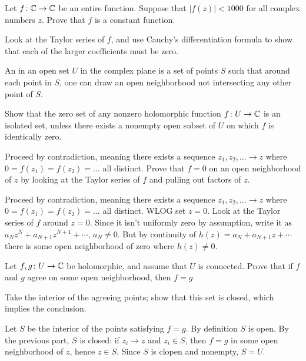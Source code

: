 \begin{sproblem}
	\gim
	Let $f \colon \mathbb C \to \mathbb C$ be an entire function.
	Suppose that $\left\lvert f(z) \right\rvert < 1000$ for all complex numbers $z$.
	Prove that $f$ is a constant function.
	\begin{hint}
		Look at the Taylor series of $f$,
		and use Cauchy's differentiation formula to
		show that each of the larger coefficients must be zero.
	\end{hint}
\end{sproblem}

\begin{sproblem}
	An  in an open set $U$ in the complex plane is a
	set of points $S$ such that around each point in $S$,
	one can draw an open neighborhood not intersecting any other point of $S$.

	Show that the zero set of any nonzero holomorphic
	function $f \colon U \to \mathbb C$ is an isolated set,
	unless there exists a nonempty open subset of $U$
	on which $f$ is identically zero.
	\begin{hint}
		Proceed by contradiction,
		meaning there exists a sequence $z_1, z_2, \dotsc \to z$
		where $0 = f(z_1) = f(z_2) = \dots$ all distinct.
		Prove that $f = 0$ on an open neighborhood of $z$
		by looking at the Taylor series of $f$ and
		pulling out factors of $z$.
	\end{hint}
	\begin{sol}
		Proceed by contradiction, meaning there exists a sequence $z_1, z_2, \dotsc \to z$
		where $0 = f(z_1) = f(z_2) = \dots$ all distinct.
		WLOG set $z=0$.
		Look at the Taylor series of $f$ around $z=0$.
		Since it isn't uniformly zero by assumption,
		write it as $a_N z^N + a_{N+1}z^{N+1} + \cdots$, $a_N \neq 0$.
		But by continuity of $h(z) = a_N + a_{N+1}z + \cdots$ there is some
		open neighborhood of zero where $h(z) \neq 0$.
	\end{sol}
\end{sproblem}

\begin{sproblem}
	\label{prob:identity_thm}
	\gim
	Let $f, g \colon U \to \mathbb C$ be holomorphic, and assume that $U$ is connected.
	Prove that if $f$ and $g$ agree on some open neighborhood,
	then $f = g$.
	\begin{hint}
		Take the interior of the agreeing points;
		show that this set is closed, which implies the conclusion.
	\end{hint}
	\begin{sol}
		Let $S$ be the interior of the points satisfying $f=g$.
		By definition $S$ is open.
		By the previous part, $S$ is closed: if $z_i \to z$ and $z_i \in S$,
		then $f=g$ in some open neighborhood of $z$, hence $z \in S$.
		Since $S$ is clopen and nonempty, $S = U$.
	\end{sol}
\end{sproblem}

